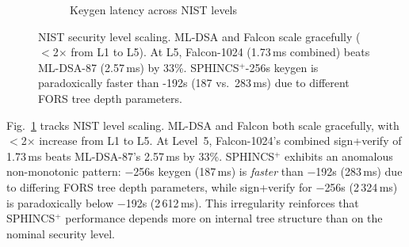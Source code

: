 \begin{figure}[t]
\vspace{2mm}
\begin{subfigure}[b]{\columnwidth}
\centering
{}
\caption{Keygen latency across NIST levels}
\end{subfigure}
\caption{NIST security level scaling.  ML-DSA and Falcon scale gracefully ($<$2$\times$
  from L1 to L5).  At L5, Falcon-1024 (1.73\,ms combined) beats ML-DSA-87 (2.57\,ms)
  by 33\%.  SPHINCS$^+$-256s keygen is paradoxically faster than -192s (187 vs.\ 283\,ms)
  due to different FORS tree depth parameters.}
\label{fig:sig_nist_dual}
\end{figure}

Fig.~\ref{fig:sig_nist_dual} tracks NIST level scaling.  ML-DSA and
Falcon both scale gracefully, with $<$2$\times$ increase from L1 to
L5.  At Level~5, Falcon-1024's combined sign+verify of 1.73\,ms beats
ML-DSA-87's 2.57\,ms by 33\%.  SPHINCS$^+$ exhibits an anomalous
non-monotonic pattern: $-$256s keygen (187\,ms) is \emph{faster} than
$-$192s (283\,ms) due to differing FORS tree depth parameters,
while sign+verify for $-$256s (2\,324\,ms) is paradoxically below
$-$192s (2\,612\,ms).  This irregularity reinforces that SPHINCS$^+$
performance depends more on internal tree structure than on the
nominal security level.

